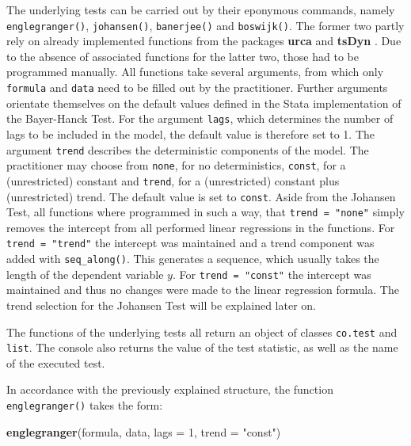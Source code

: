 \documentclass[11pt,a4paper]{article}
\newenvironment{Shaded}{\begin{snugshade}}{\end{snugshade}}
\newcommand{\DataTypeTok}[1]{\textcolor[rgb]{0.13,0.29,0.53}{#1}}
\newcommand{\DecValTok}[1]{\textcolor[rgb]{0.00,0.00,0.81}{#1}}
\newcommand{\KeywordTok}[1]{\textcolor[rgb]{0.13,0.29,0.53}{\textbf{#1}}}
\newcommand{\NormalTok}[1]{#1}
\newcommand{\StringTok}[1]{\textcolor[rgb]{0.31,0.60,0.02}{#1}}
\begin{document}
The underlying tests can be carried out by their eponymous commands,
namely \texttt{englegranger()}, \texttt{johansen()}, \texttt{banerjee()}
and \texttt{boswijk()}. The former two partly rely on already
implemented functions from the packages \textbf{urca}
\autocite{pfaff_urca_2020} and \textbf{tsDyn}
\autocite{stigler_tsdyn_2020}. Due to the absence of associated
functions for the latter two, those had to be programmed manually. All
functions take several arguments, from which only \texttt{formula} and
\texttt{data} need to be filled out by the practitioner. Further
arguments orientate themselves on the default values defined in the
Stata implementation of the Bayer-Hanck Test. For the argument
\texttt{lags}, which determines the number of lags to be included in the
model, the default value is therefore set to 1. The argument
\texttt{trend} describes the deterministic components of the model. The
practitioner may choose from \texttt{none}, for no deterministics,
\texttt{const}, for a (unrestricted) constant and \texttt{trend}, for a
(unrestricted) constant plus (unrestricted) trend. The default value is
set to \texttt{const}. Aside from the Johansen Test, all functions where
programmed in such a way, that \texttt{trend\ =\ "none"} simply removes
the intercept from all performed linear regressions in the functions.
For \texttt{trend\ =\ "trend"} the intercept was maintained and a trend
component was added with \texttt{seq\_along()}. This generates a
sequence, which usually takes the length of the dependent variable
\(y\). For \texttt{trend\ =\ "const"} the intercept was maintained and
thus no changes were made to the linear regression formula. The trend
selection for the Johansen Test will be explained later on.

The functions of the underlying tests all return an object of classes
\texttt{co.test} and \texttt{list}. The console also returns the value
of the test statistic, as well as the name of the executed test.

In accordance with the previously explained structure, the function
\texttt{englegranger()} takes the form:

\begin{Shaded}
\begin{Highlighting}[]
\KeywordTok{englegranger}\NormalTok{(formula, data, }\DataTypeTok{lags =} \DecValTok{1}\NormalTok{, }\DataTypeTok{trend =} \StringTok{"const"}\NormalTok{)}
\end{Highlighting}
\end{Shaded}
\end{document}
